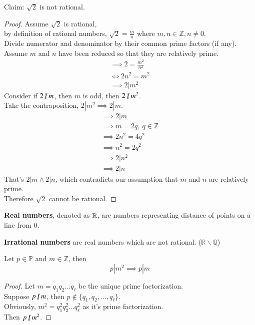 \documentclass[10pt]{article}
\begin{document}
	\begin{example}
		Claim: $\sqrt{2}$ is not rational.
	\end{example}
	\begin{proof}
		Assume $\sqrt{2}$ is rational, \\
		by definition of rational numbers, $\sqrt{2} = \frac{m}{n}$ where $m,n \in \mathbb{Z}, n \neq 0$. \\
		Divide numerator and denominator by their common prime factors (if any). \\
		Assume $m$ and $n$ have been reduced so that they are relatively prime. \\
		\begin{gather*}
			\implies 2 = \frac{m^2}{n^2}\\
			\iff 2n^2 = m^2 \\
			\implies 2 | m^2 
		\end{gather*}
		Consider if $2 \centernot | m$, then $m$ is odd, then $2 \centernot | m^2$. \\
		Take the contraposition, $2 | m^2 \implies 2 | m$. \\
		\begin{gather*}
			\implies 2 | m \\
			\implies m = 2q,\ q \in \mathbb{Z} \\
			\implies 2n^2 = 4 q ^2 \\
			\implies n^2 = 2q^2 \\
			\implies 2 | n^2 \\
			\implies 2 | n
		\end{gather*}
		That's $2 | m \land 2 | n$, which contradicts our assumption that $m$ and $n$ are relatively prime. \\
		Therefore $\sqrt{2}$ cannot be rational.
	\end{proof}
	
	\begin{definition}
		\textbf{Real numbers}, denoted as $\mathbb{R}$, are numbers representing distance of points on a line from $0$.
	\end{definition}
	
	\begin{definition}
		\textbf{Irrational numbers} are real numbers which are not rational. ($\mathbb{R}\backslash \mathbb{Q}$)
	\end{definition}
	
	\begin{proposition}
		Let $p \in \mathbb{P}$ and $m \in \mathbb{Z}$, then 
		\[
		p | m^2 \implies p | m
		\]
	\end{proposition}
	\begin{proof}
		Let $m = q_1 q_2 \dots q_\ell$ be the unique prime factorization. \\
		Suppose $p \centernot | m$, then $p \notin \{q_1, q_2, \dots, q_\ell\}$. \\
		Obviously, $m^2 = q_1^2 q_2^2 \dots q_\ell^2$ as it's prime factorization. \\
		Then $p \centernot | m^2$.
	\end{proof}
	
\end{document}
